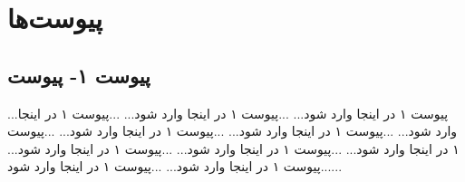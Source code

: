 \chapter*{‌پیوست‌ها}

\section*{پیوست ۱- پیوست }
...پیوست‌ ۱ در اینجا وارد شود...
...پیوست‌ ۱ در اینجا وارد شود...
...پیوست‌ ۱ در اینجا وارد شود...
...پیوست‌ ۱ در اینجا وارد شود...
...پیوست‌ ۱ در اینجا وارد شود...
...پیوست‌ ۱ در اینجا وارد شود...
...پیوست‌ ۱ در اینجا وارد شود...
...پیوست‌ ۱ در اینجا وارد شود...
...پیوست‌ ۱ در اینجا وارد شود...
...پیوست‌ ۱ در اینجا وارد شود...